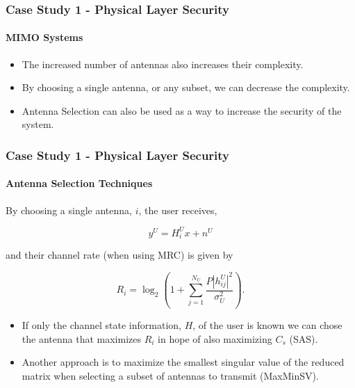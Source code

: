 \documentclass{beamer}
\begin{document}
\begin{frame}
	\frametitle{Case Study 1 - Physical Layer Security}
	\framesubtitle{MIMO Systems}
       
    \begin{itemize}
        \item The increased number of antennas also increases their complexity.
        \item By choosing a single antenna, or any subset, we can decrease the complexity. 
        \item Antenna Selection can also be used as a way to increase the security of the system.  
      
    \end{itemize}

\end{frame}

\begin{frame}
    \frametitle{Case Study 1 - Physical Layer Security}
	\framesubtitle{Antenna Selection Techniques}
    
    By choosing a single antenna, $i$, the user receives, 
    
    \begin{equation}
        y^U = H_i^Ux + n^U
    \end{equation} 
    
    and their channel rate (when using MRC) is given by 
    
    \begin{equation}
        R_i = \log_2 \left( 1 + \sum_{j=1}^{N_U} \frac{P \left| h_{ij}^U \right|^2}{\sigma_U^2}\right).
    \end{equation}
    
    
   \begin{itemize}
       \item If only the channel state information, $H$, of the user is known we can chose the antenna that maximizes $R_i$ in hope of also maximizing $C_s$ (SAS).
       \item Another approach is to maximize the smallest singular value of the reduced matrix when selecting a subset of antennas to transmit (MaxMinSV).
   \end{itemize}
             	
\end{frame}
    
    
    
\end{document}
